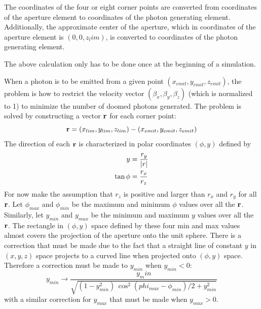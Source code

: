 The coordinates of the four or eight corner points are converted from  coordinates of
the aperture element to  coordinates of the photon generating element. Additionally, the
approximate center of the aperture, which in  coordinates of the aperture element is
$(0, 0, z_lim)$, is converted to  coordinates of the photon generating element.

The above calculation only has to be done once at the beginning of a simulation.

When a photon is to be emitted from a given point $(x_{emit}, y_{emit}, z_{emit})$, the problem is
how to restrict the velocity vector $(\beta_x, \beta_y, \beta_z)$ (which is normalized to 1) to
minimize the number of doomed photons generated. The problem is solved by constructing a vector ${\bf r}$ for each corner point:
\begin{equation}
  {\bf r} = (x_{lim}, y_{lim}, z_{lim}) - (x_{emit}, y_{emit}, z_{emit})
\end{equation} 
The direction of each ${\bf r}$ is characterized in polar coordinates $(\phi, y)$ defined by
\begin{align}
  y &= \frac{r_y}{|r|} \nonumber \\
  \tan\phi &= \frac{r_x}{r_z} 
\end{align}
For now make the assumption that $r_z$ is positive and larger than $r_x$ and $r_y$ for all ${\bf r}$.
Let $\phi_{max}$ and $\phi_{min}$ be the maximum and minimum $\phi$ values over all the ${\bf r}$. Similarly, let $y_{min}$ and $y_{max}$ be the minimum and maximum $y$ values over all the ${\bf r}$. The rectangle in $(\phi, y)$ space defined by these four min and max values almost covers the
projection of the aperture onto the unit sphere. There is a correction that must be made due to the
fact that a straight line of constant $y$ in $(x, y, z)$ space projects to a curved line when
projected onto $(\phi, y)$ space. Therefore a correction must be made to $y_{min}$ when $y_{min} <
0$:
\begin{equation}
  y_{min} \rightarrow 
  \frac{y_min}{\sqrt{(1 - y_{min}^2) \, \cos^2 (phi_{max} - \phi_{min})/2 + y_{min}^2}}
\end{equation}
with a similar correction for $y_{max}$ that must be made when $y_{max} > 0$.


